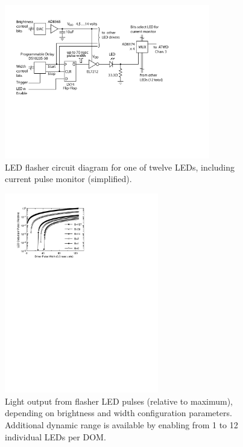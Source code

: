 \begin{figure}[h]
 \centering
 \includegraphics[width=0.8\textwidth]{graphics/dom/functional/domfig4-FlasherDiagram.pdf}
 \caption{LED flasher circuit diagram for one of twelve LEDs, including current pulse monitor (simplified).}
 \label{fig:flasherdiagram}
\end{figure}

\begin{figure}[h]
 \centering
 \includegraphics[width=0.6\textwidth]{graphics/dom/functional/domfig5-BrightnessModel.pdf}
 \caption{Light output from flasher LED pulses (relative to maximum), depending
on brightness and width configuration parameters.  Additional dynamic range is available
by enabling from 1 to 12 individual LEDs per DOM.}
 \label{fig:flasheroutput}
\end{figure}

